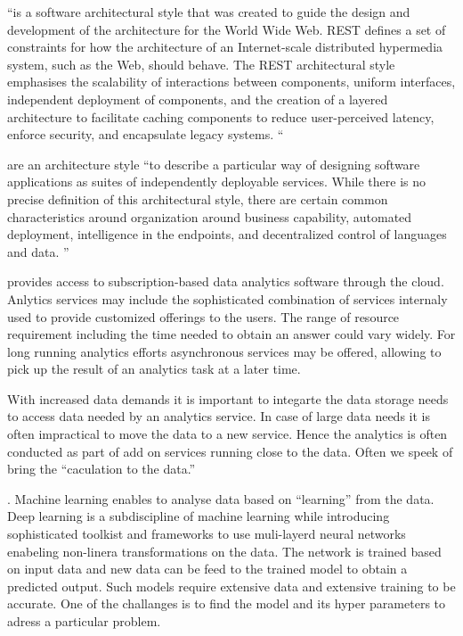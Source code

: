 \begin{description}
{\item[Representational state transfer (REST)]
     ``is a software architectural style that was created to guide the
     design and development of the architecture for the World Wide
     Web. REST defines a set of constraints for how the architecture
     of an Internet-scale distributed hypermedia system, such as the
     Web, should behave. The REST architectural style emphasises the
     scalability of interactions between components, uniform
     interfaces, independent deployment of components, and the
     creation of a layered architecture to facilitate caching
     components to reduce user-perceived latency, enforce security,
     and encapsulate legacy systems.\cite{www-rest} `` 

\item[Microservices]
     are an architecture style ``to describe a particular way of
     designing software applications as suites of independently
     deployable services. While there is no precise definition of this
     architectural style, there are certain common characteristics
     around organization around business capability, automated
     deployment, intelligence in the endpoints, and decentralized
     control of languages and data. \cite{www-microservices}''

\item[Analytics as a service]
     provides access to subscription-based data analytics software
     through the cloud. Anlytics services may include the
     sophisticated combination of services internaly used to provide
     customized offerings to the users. The range of resource
     requirement including the time needed to obtain an answer could
     vary widely. For long running analytics efforts asynchronous
     services may be offered, allowing to pick up the result of an
     analytics task at a later time.

\item[Data analytics as a service]
     With increased data demands it is important to integarte the data
     storage needs to access data needed by an analytics service. In
     case of large data needs it is often impractical to move the data
     to a new service. Hence the analytics is often conducted as part
     of add on services running close to the data. Often we speek of
     bring the ``caculation to the data.''

\item[Machine and leep learning].
     Machine learning enables to analyse data based on ``learning''
     from the data. Deep learning is a subdiscipline of machine
     learning while introducing sophisticated toolkist and frameworks
     to use muli-layerd neural networks enabeling non-linera
     transformations on the data. The network is trained based on
     input data and new data can be feed to the trained model to
     obtain a predicted output. Such models require extensive data and
     extensive training to be accurate. One of the challanges is to
     find the model and its hyper parameters to adress a particular
     problem.

}
\end{description}
